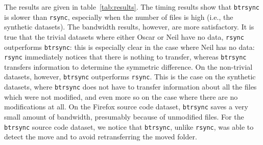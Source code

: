 \documentclass[11pt]{llncs}
\newcommand{\btrsync}{\texttt{btrsync}\xspace}
\newcommand{\rsync}{\texttt{rsync}\xspace}
\begin{document}
The results are given in table~\ref{tab:results}. The timing results show that
\btrsync is slower than \rsync, especially when the number of files is high
(i.e., the synthetic datasets). The bandwidth results, however, are more
satisfactory. It is true that the trivial datasets where either Oscar or Neil
have no data, \rsync outperforms \btrsync: this is especially clear in the case
where Neil has no data: \rsync immediately notices that there is nothing to
transfer, whereas \btrsync transfers information to determine the symmetric
difference. On the non-trivial datasets, however, \btrsync outperforms \rsync.
This is the case on the synthetic datasets, where \btrsync does not have to
transfer information about all the files which were not modified, and even more
so on the case where there are no modifications at all. On the Firefox source
code dataset, \btrsync saves a very small amount of bandwidth, presumably
because of unmodified files. For the \btrsync source code dataset, we notice
that \btrsync, unlike \rsync, was able to detect the move and to avoid
retransferring the moved folder.
\end{document}
